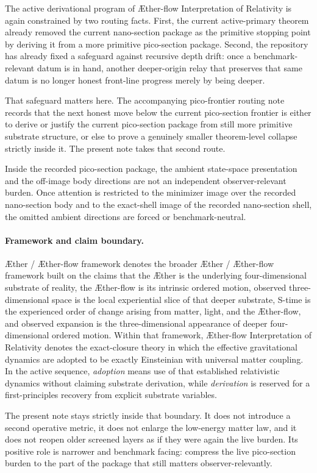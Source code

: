\documentclass[11pt]{article}
\newcommand{\Aether}{\AE{}ther}
\newcommand{\Aflow}{\AE{}ther-flow}
\newcommand{\TheoryName}{\Aflow{} Interpretation of Relativity}
\newcommand{\TheoryProgram}{\Aether{} / \Aflow{} framework}
\begin{document}
The active derivational program of \TheoryName{} is again constrained by two routing facts. First, the current active-primary theorem already removed the current nano-section package as the primitive stopping point by deriving it from a more primitive pico-section package. Second, the repository has already fixed a safeguard against recursive depth drift: once a benchmark-relevant datum is in hand, another deeper-origin relay that preserves that same datum is no longer honest front-line progress merely by being deeper.

That safeguard matters here. The accompanying pico-frontier routing note records that the next honest move below the current pico-section frontier is either to derive or justify the current pico-section package from still more primitive substrate structure, or else to prove a genuinely smaller theorem-level collapse strictly inside it. The present note takes that second route.

Inside the recorded pico-section package, the ambient state-space presentation and the off-image body directions are not an independent observer-relevant burden. Once attention is restricted to the minimizer image over the recorded nano-section body and to the exact-shell image of the recorded nano-section shell, the omitted ambient directions are forced or benchmark-neutral.

\paragraph{Framework and claim boundary.}
\TheoryProgram{} denotes the broader \Aether{} / \Aflow{} framework built on the claims that the \Aether{} is the underlying four-dimensional substrate of reality, the \Aflow{} is its intrinsic ordered motion, observed three-dimensional space is the local experiential slice of that deeper substrate, S-time is the experienced order of change arising from matter, light, and the \Aflow{}, and observed expansion is the three-dimensional appearance of deeper four-dimensional ordered motion. Within that framework, \TheoryName{} denotes the exact-closure theory in which the effective gravitational dynamics are adopted to be exactly Einsteinian with universal matter coupling. In the active sequence, \emph{adoption} means use of that established relativistic dynamics without claiming substrate derivation, while \emph{derivation} is reserved for a first-principles recovery from explicit substrate variables.

The present note stays strictly inside that boundary. It does not introduce a second operative metric, it does not enlarge the low-energy matter law, and it does not reopen older screened layers as if they were again the live burden. Its positive role is narrower and benchmark facing: compress the live pico-section burden to the part of the package that still matters observer-relevantly.
\end{document}
